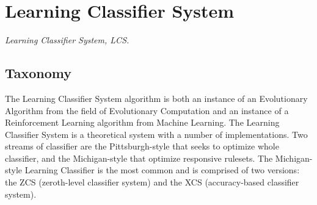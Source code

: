 

\section{Learning Classifier System} 
\label{sec:learning_classifier_system}

\emph{Learning Classifier System, LCS.}

\subsection{Taxonomy}
The Learning Classifier System algorithm is both an instance of an Evolutionary Algorithm from the field of Evolutionary Computation and an instance of a Reinforcement Learning algorithm from Machine Learning.
The Learning Classifier System is a theoretical system with a number of implementations. Two streams of classifier are the Pittsburgh-style that seeks to optimize whole classifier, and the Michigan-style that optimize responsive rulesets. 
The Michigan-style Learning Classifier is the most common and is comprised of two versions: the ZCS (zeroth-level classifier system) and the XCS (accuracy-based classifier system).

